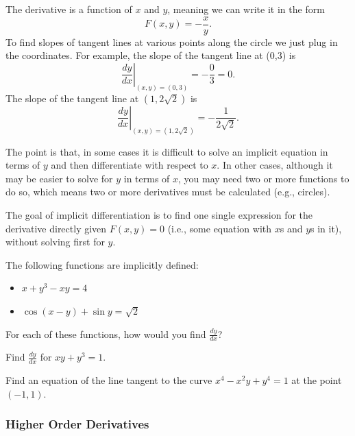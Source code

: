 \documentclass[cal1spr16Lectures.tex]{subfiles}
\begin{document}
\begin{frame}\footnotesize
The derivative is a function of $x$ and $y$, meaning we can write it in the form 
\[F(x,y)=-\frac{x}{y}.\] 
To find slopes of tangent lines at various points along the circle we just plug in the coordinates.  For example, the slope of the tangent line at (0,3) is 
\[\left. \frac{dy}{dx} \right|_{(x,y)=(0,3)} = -\frac{0}{3}=0.\]
The slope of the tangent line at $(1,2\sqrt{2})$ is
\[\left. \frac{dy}{dx} \right|_{(x,y)=(1,2\sqrt{2})} = -\frac{1}{2\sqrt{2}}.\]
\end{frame}

\begin{frame}\footnotesize
The point is that, in some cases it is difficult to solve an implicit equation in terms of $y$ and then differentiate with respect to $x$.  In other cases, although it may be easier to solve for $y$ in terms of $x$, you may need two or more functions to do so, which means two or more derivatives must be calculated (e.g., circles).

\vspace{1pc}
The goal of implicit differentiation is to find one single expression for the derivative directly given $F(x,y)=0$ (i.e., some equation with $x$s and $y$s in it), without solving first for $y$.
\end{frame}

\begin{frame}%
\begin{que} The following functions are \alert{implicitly} defined:
\begin{itemize}
\item $x+y^3-xy=4$
\item $\cos(x-y)+\sin y = \sqrt{2}$
\end{itemize}
For each of these functions, how would you find $\textstyle\frac{dy}{dx}$?
\end{que}
\end{frame}

\begin{frame}{}
\begin{exe} Find $\textstyle\frac{dy}{dx}$ for $xy+y^3=1$. \end{exe}
\begin{exe} Find an equation of the line tangent to the curve $x^4-x^2 y+y^4=1$ at the point $(-1,1)$. \end{exe}
\end{frame}

\subsubsection{Higher Order Derivatives}
\end{document}
